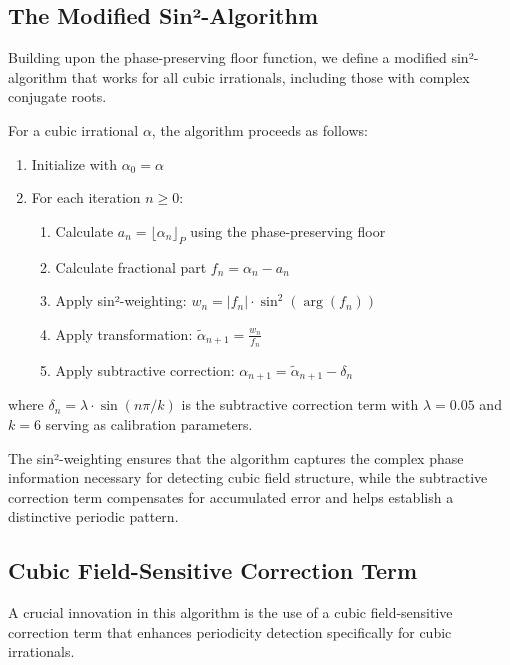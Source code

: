 \subsection{The Modified Sin²-Algorithm}

Building upon the phase-preserving floor function, we define a modified sin²-algorithm that works for all cubic irrationals, including those with complex conjugate roots.

\begin{algorithm_def}
For a cubic irrational $\alpha$, the algorithm proceeds as follows:
\begin{enumerate}
    \item Initialize with $\alpha_0 = \alpha$
    \item For each iteration $n \geq 0$:
    \begin{enumerate}
        \item Calculate $a_n = \lfloor \alpha_n \rfloor_P$ using the phase-preserving floor
        \item Calculate fractional part $f_n = \alpha_n - a_n$
        \item Apply sin²-weighting: $w_n = |f_n| \cdot \sin^2(\arg(f_n))$
        \item Apply transformation: $\tilde{\alpha}_{n+1} = \frac{w_n}{f_n}$
        \item Apply subtractive correction: $\alpha_{n+1} = \tilde{\alpha}_{n+1} - \delta_n$
    \end{enumerate}
\end{enumerate}
where $\delta_n = \lambda \cdot \sin(n\pi/k)$ is the subtractive correction term with $\lambda = 0.05$ and $k = 6$ serving as calibration parameters.
\end{algorithm_def}

The sin²-weighting ensures that the algorithm captures the complex phase information necessary for detecting cubic field structure, while the subtractive correction term compensates for accumulated error and helps establish a distinctive periodic pattern.

\subsection{Cubic Field-Sensitive Correction Term}

A crucial innovation in this algorithm is the use of a cubic field-sensitive correction term that enhances periodicity detection specifically for cubic irrationals.

